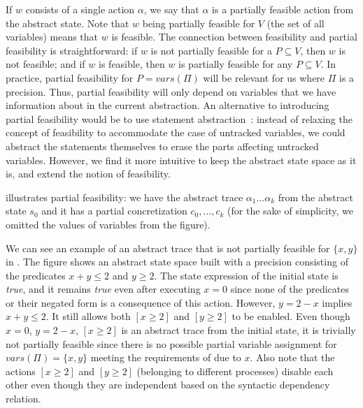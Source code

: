 \documentclass[numbook]{svjour3}
\begin{document}
If $w$ consists of a single action $\alpha$, we say that $\alpha$ is a partially feasible action from the abstract state. Note that $w$ being partially feasible for $V$ (the set of all variables) means that $w$ is feasible. The connection between feasibility and partial feasibility is straightforward: if $w$ is not partially feasible for a $P \subseteq V$, then $w$ is not feasible; and if $w$ is feasible, then $w$ is partially feasible for any $P \subseteq V$. In practice, partial feasibility for $P = {vars}(\Pi)$ will be relevant for us where $\Pi$ is a precision. Thus, partial feasibility will only depend on variables that we have information about in the current abstraction. An alternative to introducing partial feasibility would be to use statement abstraction~\cite{farzan_stratified_commutativity}: instead of relaxing the concept of feasibility to accommodate the case of untracked variables, we could abstract the statements themselves to erase the parts affecting untracked variables. However, we find it more intuitive to keep the abstract state space as it is, and extend the notion of feasibility.

\begin{example}
	\label{example:por-partial-concretization}
	 illustrates partial feasibility: we have the abstract trace $\alpha_1...\alpha_k$ from the abstract state $s_0$ and it has a partial concretization $c_0, ..., c_k$ (for the sake of simplicity, we omitted the values of variables from the figure).
	
	We can see an example of an abstract trace that is not partially feasible for $\{x, y\}$ in . The figure shows an abstract state space built with a precision consisting of the predicates $x+y \le 2$ and $y \ge 2$. The state expression of the initial state is \emph{true}, and it remains \emph{true} even after executing $x = 0$ since none of the predicates or their negated form is a consequence of this action. However, $y = 2 - x$ implies $x+y \le 2$. It still allows both $[x \ge 2]$ and $[y \ge 2]$ to be enabled. Even though $x = 0$, $y = 2 - x$, $[x \ge 2]$ is an abstract trace from the initial state, it is trivially not partially feasible since there is no possible partial variable assignment for ${vars}(\Pi) = \{x, y\}$ meeting the requirements of  due to $x$. Also note that the actions $[x \ge 2]$ and $[y \ge 2]$ (belonging to different processes) disable each other even though they are independent based on the syntactic dependency relation.
\end{example}
\end{document}
